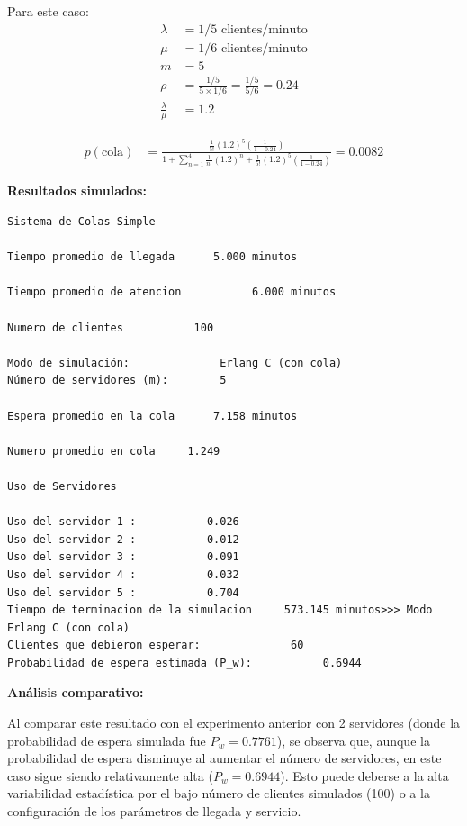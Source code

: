 \documentclass{article}
\begin{document}
Para este caso:
\begin{align*}
    \lambda &= 1/5 \text{ clientes/minuto} \\
    \mu &= 1/6 \text{ clientes/minuto} \\
    m &= 5 \\
    \rho &= \frac{1/5}{5 \times 1/6} = \frac{1/5}{5/6} = 0.24 \\
    \frac{\lambda}{\mu} &= 1.2
\end{align*}

\begin{align*}
p(\text{cola}) &= \frac{\frac{1}{5!}(1.2)^5 \left( \frac{1}{1-0.24} \right)}{1 + \sum_{n=1}^{4} \frac{1}{n!}(1.2)^n + \frac{1}{5!}(1.2)^5 \left( \frac{1}{1-0.24} \right)} = 0.0082
\end{align*}

\textbf{Resultados simulados:}

\begin{verbatim}
Sistema de Colas Simple

Tiempo promedio de llegada      5.000 minutos

Tiempo promedio de atencion           6.000 minutos

Numero de clientes           100

Modo de simulación:              Erlang C (con cola)
Número de servidores (m):        5

Espera promedio en la cola      7.158 minutos

Numero promedio en cola     1.249

Uso de Servidores

Uso del servidor 1 :           0.026
Uso del servidor 2 :           0.012
Uso del servidor 3 :           0.091
Uso del servidor 4 :           0.032
Uso del servidor 5 :           0.704
Tiempo de terminacion de la simulacion     573.145 minutos>>> Modo Erlang C (con cola)
Clientes que debieron esperar:              60
Probabilidad de espera estimada (P_w):           0.6944
\end{verbatim}

\textbf{Análisis comparativo:}

Al comparar este resultado con el experimento anterior con 2 servidores (donde la probabilidad de espera simulada fue $P_w = 0.7761$), se observa que, aunque la probabilidad de espera disminuye al aumentar el número de servidores, en este caso sigue siendo relativamente alta ($P_w = 0.6944$). Esto puede deberse a la alta variabilidad estadística por el bajo número de clientes simulados (100) o a la configuración de los parámetros de llegada y servicio. 
\end{document}
